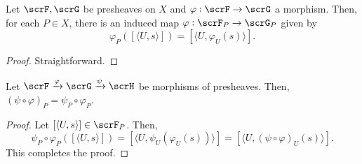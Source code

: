 \begin{proposition}
    Let $\scrF,\scrG$ be presheaves on $X$ and $\varphi:\scrF\to\scrG$ a morphism. Then, for each $P\in X$, there is an induced map $\varphi:\scrF_P\to\scrG_P$ given by
    \begin{equation*}
        \varphi_P([\langle U, s\rangle]) = [\langle U, \varphi_U(s)\rangle].
    \end{equation*}
\end{proposition}
\begin{proof}
    Straightforward.
\end{proof}

\begin{proposition}
    Let $\scrF\xrightarrow{\varphi}\scrG\xrightarrow{\psi}\scrH$ be morphisms of presheaves. Then, $(\psi\circ\varphi)_P = \psi_P\circ\varphi_P$.
\end{proposition}
\begin{proof}
    Let $[\langle U, s\rangle]\in\scrF_P$. Then, 
    \begin{equation*}
        \psi_P\circ\varphi_P([\langle U, s\rangle]) = [\langle U, \psi_U(\varphi_U(s))\rangle] = [\langle U, (\psi\circ\varphi)_U(s)\rangle].
    \end{equation*}
    This completes the proof.
\end{proof}

